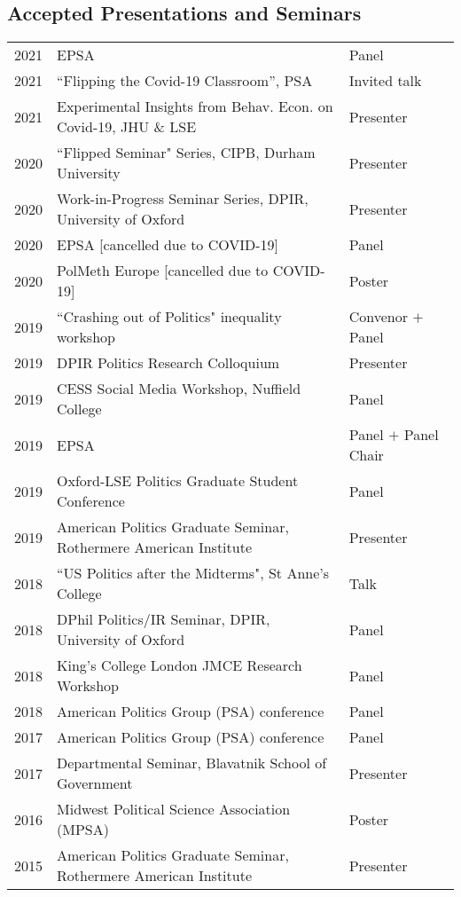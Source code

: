 \documentclass[11pt, a4paper]{article}
\begin{document}
 \subsection*{Accepted Presentations and Seminars}

 \begin{tabular}{lll}
     2021 & EPSA & Panel \\
     2021 & ``Flipping the Covid-19 Classroom'', PSA & Invited talk \\
     2021 &  Experimental Insights from Behav. Econ. on Covid-19, JHU \& LSE & Presenter \\
     2020 & ``Flipped Seminar" Series, CIPB, Durham University & Presenter \\
     2020 & Work-in-Progress Seminar Series, DPIR, University of Oxford & Presenter \\
     2020 & EPSA [cancelled due to COVID-19] & Panel \\
     2020 & PolMeth Europe [cancelled due to COVID-19] & Poster \\
     2019 & ``Crashing out of Politics" inequality workshop & Convenor $+$ Panel \\
     2019 & DPIR Politics Research Colloquium & Presenter \\
     2019 & CESS Social Media Workshop, Nuffield College & Panel \\
     2019 & EPSA  & Panel $+$ Panel Chair \\
     2019 & Oxford-LSE Politics Graduate Student Conference & Panel \\
     2019 & American Politics Graduate Seminar, Rothermere American Institute & Presenter \\
     2018 & ``US Politics after the Midterms", St Anne's College & Talk \\
     2018 & DPhil Politics/IR Seminar, DPIR, University of Oxford & Panel \\
     2018 & King's College London JMCE Research Workshop & Panel \\
     2018 & American Politics Group (PSA) conference & Panel \\
     2017 & American Politics Group (PSA) conference & Panel \\
     2017 & Departmental Seminar, Blavatnik School of Government & Presenter \\
     2016 & Midwest Political Science Association (MPSA) & Poster \\
     2015 & American Politics Graduate Seminar, Rothermere American Institute & Presenter
 \end{tabular}
\end{document}

